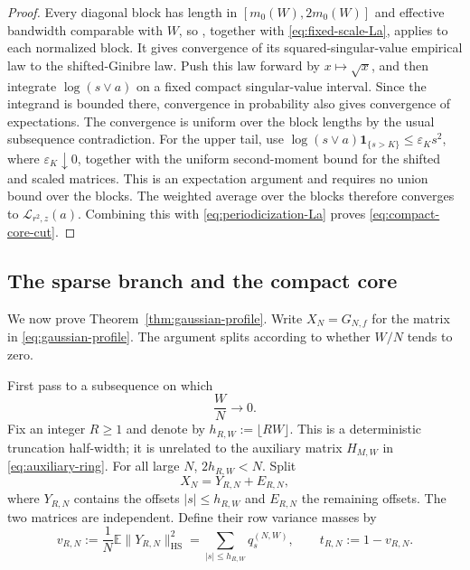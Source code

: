 \documentclass[11pt,reqno]{amsart}
\numberwithin{equation}{section}
\theoremstyle{definition}
\theoremstyle{remark}
\newcommand{\E}{\mathbb E}
\newcommand{\1}{\mathbf 1}
\newcommand{\HS}{\mathrm{HS}}
\begin{document}
\begin{proof}
Every diagonal block has length in
\([m_0(W),2m_0(W)]\) and effective bandwidth
comparable with $W$, so \cite[Theorem~3.6]{Han2410}, together with
\eqref{eq:fixed-scale-La}, applies to each normalized block.
It gives convergence of its squared-singular-value empirical law to the
shifted-Ginibre law.  Push this law forward by \(x\mapsto\sqrt x\), and
then integrate \(\log(s\vee a)\) on a fixed compact singular-value
interval.  Since the integrand is bounded there, convergence
in probability also gives convergence of expectations.  The convergence is
uniform over the block lengths by the usual subsequence contradiction.  For
the upper tail, use
$\log(s\vee a)\1_{\{s>K\}}\le\varepsilon_Ks^2$, where
$\varepsilon_K\downarrow0$, together with the uniform second-moment bound
for the shifted and scaled matrices.  This is an expectation argument and
requires no union bound over the blocks.  The
weighted average over the blocks therefore converges to
$\mathcal L_{r^2,z}(a)$.  Combining this with
\eqref{eq:periodicization-La} proves \eqref{eq:compact-core-cut}.
\end{proof}

\subsection{The sparse branch and the compact core}

We now prove Theorem~\ref{thm:gaussian-profile}.  Write
$X_N=G_{N,f}$ for the matrix in \eqref{eq:gaussian-profile}.  The argument
splits according to whether $W/N$ tends to zero.

First pass to a subsequence on which
\begin{equation}\label{eq:sparse-profile-regime}
 \frac WN\longrightarrow0.
\end{equation}
Fix an integer $R\ge1$ and denote by $h_{R,W}:=\lfloor RW\rfloor$.  This is a
deterministic truncation half-width; it is unrelated to the auxiliary
matrix $H_{M,W}$ in \eqref{eq:auxiliary-ring}.  For all large $N$,
$2h_{R,W}<N$.  Split
\begin{equation}\label{eq:core-tail-split}
 X_N=Y_{R,N}+E_{R,N},
\end{equation}
where $Y_{R,N}$ contains the offsets $|s|\le h_{R,W}$ and $E_{R,N}$ the
remaining offsets.  The two matrices are independent.  Define their row
variance masses by
\begin{equation}\label{eq:core-tail-masses}
 v_{R,N}:=\frac1N\E\|Y_{R,N}\|_{\HS}^2
 =\sum_{|s|\le h_{R,W}}q_s^{(N,W)},\qquad
 t_{R,N}:=1-v_{R,N}.
\end{equation}
\end{document}

